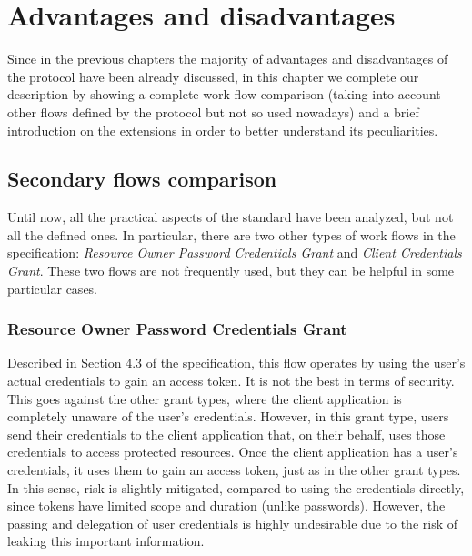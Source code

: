 
\chapter{Advantages and disadvantages}
Since in the previous chapters the majority of advantages and disadvantages of the protocol have been already discussed, in this chapter we complete our \textit{\oauth} description by showing a complete work flow comparison (taking into account other flows defined by the protocol but not so used nowadays) and a brief introduction on the extensions in order to better understand its peculiarities. 

\minitoc

\section{Secondary flows comparison}
Until now, all the practical aspects of the standard  \cite{RFC6749} have been analyzed, but not all the defined ones. In particular, there are two other types of work flows in the specification: \textit{Resource Owner Password Credentials Grant} and \textit{Client Credentials Grant}. These two flows are not frequently used, but they can be helpful in some particular cases.

\subsection{Resource Owner Password Credentials Grant}
Described in Section 4.3 of the specification, this flow operates by using the user's actual credentials to gain an access token. It is not the best in terms of security. This goes against the other grant types, where the client application is completely unaware of the user's credentials. However, in this grant type, users send their credentials to the client application that, on their behalf, uses those credentials to access protected resources.
Once the client application has a user's credentials, it uses them to gain an access token, just as in the other grant types. In this sense, risk is slightly mitigated, compared to using the credentials directly, since tokens have limited scope and duration (unlike passwords). However, the passing and delegation of user credentials is highly undesirable due to the risk of leaking this important information.

